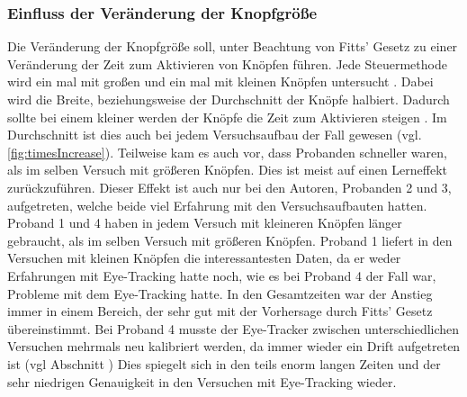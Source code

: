 \subsubsection{Einfluss der Veränderung der Knopfgröße} 
Die Veränderung der Knopfgröße soll, unter Beachtung von Fitts' Gesetz zu einer Veränderung der Zeit zum Aktivieren von Knöpfen führen. Jede Steuermethode wird ein mal mit großen und ein mal mit kleinen Knöpfen untersucht . Dabei wird die Breite, beziehungsweise der Durchschnitt der Knöpfe halbiert. Dadurch sollte bei einem kleiner werden der Knöpfe die Zeit zum Aktivieren steigen . Im Durchschnitt ist dies auch  bei jedem Versuchsaufbau der Fall gewesen (vgl. \autoref{fig:timesIncrease}). Teilweise kam es auch vor, dass Probanden schneller waren, als im selben Versuch mit größeren Knöpfen. Dies ist meist auf einen Lerneffekt zurückzuführen. Dieser Effekt ist auch nur bei den Autoren, Probanden 2 und 3, aufgetreten, welche beide viel Erfahrung mit den Versuchsaufbauten hatten. Proband 1 und 4 haben in jedem Versuch mit kleineren Knöpfen länger gebraucht, als im selben Versuch mit größeren Knöpfen. Proband 1 liefert in den Versuchen mit kleinen Knöpfen die interessantesten Daten, da er weder Erfahrungen mit Eye-Tracking hatte noch, wie es bei Proband 4 der Fall war, Probleme mit dem Eye-Tracking hatte. In den Gesamtzeiten war der Anstieg immer in einem Bereich, der sehr gut mit der Vorhersage durch Fitts' Gesetz übereinstimmt. Bei Proband 4 musste der Eye-Tracker zwischen unterschiedlichen Versuchen mehrmals neu kalibriert werden, da immer wieder ein Drift aufgetreten ist (vgl Abschnitt ) Dies spiegelt sich in den teils enorm langen Zeiten und der sehr niedrigen Genauigkeit in den Versuchen mit Eye-Tracking wieder. 

